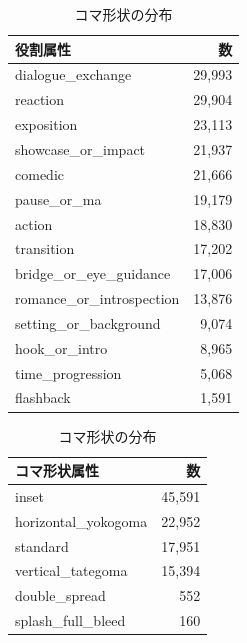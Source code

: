 \documentclass[a4j,12pt,dvipdfmx]{jsreport}
\begin{document}
\begin{table}[htbp]
   \centering

   \begin{minipage}[t]{0.48\linewidth}
      \centering
      \caption{役割属性の分布}
      \label{tab:panel_roles_stats}
      \begin{tabular}{lr}
         \toprule
         \textbf{役割属性}              & \textbf{数} \\
         \midrule
         dialogue\_exchange         & 29{,}993   \\
         reaction                   & 29{,}904   \\
         exposition                 & 23{,}113   \\
         showcase\_or\_impact       & 21{,}937   \\
         comedic                    & 21{,}666   \\
         pause\_or\_ma              & 19{,}179   \\
         action                     & 18{,}830   \\
         transition                 & 17{,}202   \\
         bridge\_or\_eye\_guidance  & 17{,}006   \\
         romance\_or\_introspection & 13{,}876   \\
         setting\_or\_background    & 9{,}074    \\
         hook\_or\_intro            & 8{,}965    \\
         time\_progression          & 5{,}068    \\
         flashback                  & 1{,}591    \\
         \bottomrule
      \end{tabular}
   \end{minipage}
   \hfill %
   \begin{minipage}[t]{0.48\linewidth}
      \centering
      \caption{コマ形状の分布}
      \label{tab:panel_shape_stats}
      \begin{tabular}{lr}
         \toprule
         \textbf{コマ形状属性}      & \textbf{数} \\
         \midrule
         inset                & 45{,}591   \\
         horizontal\_yokogoma & 22{,}952   \\
         standard             & 17{,}951   \\
         vertical\_tategoma   & 15{,}394   \\
         double\_spread       & 552        \\
         splash\_full\_bleed  & 160        \\
         \bottomrule
      \end{tabular}


\end{minipage}
\end{table}
\end{document}

